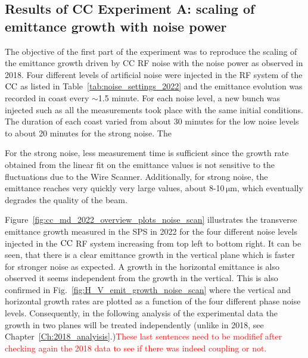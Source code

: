 \subsection{Results of CC Experiment A: scaling of emittance growth with noise power}

The objective of the first part of the experiment was to reproduce the scaling of the emittance growth driven by CC RF noise with the noise power as observed in 2018. Four different levels of artificial noise were injected in the RF system of the ${\mathrm{CC}}$ as listed in Table~\ref{tab:noise_settings_2022} and the emittance evolution was recorded in coast every $\sim$1.5 minute. For each noise level, a new bunch was injected such as all the measurements took place with the same initial conditions. The duration of each coast varied from about 30 minutes for the low noise levels to about 20 minutes for the strong noise. The 

For the strong noise, less measurement time is sufficient since the growth rate obtained from the linear fit on the emittance values is not sensitive to the fluctuations due to the Wire Scanner. Additionally, for strong noise, the emittance reaches very quickly very large values, about 8-10\,$\mathrm{\mu m}$, which eventually degrades the quality of the beam.

Figure~\ref{fig:cc_md_2022_overview_plots_noise_scan} illustrates the transverse emittance growth measured in the SPS in 2022 for the four different noise levels injected in the ${\mathrm{CC}}$ RF system increasing from top left to bottom right. It can be seen, that there is a clear emittance growth in the vertical plane which is faster for stronger noise as expected. A growth in the horizontal emittance is also observed it seems independent from the growth in the vertical. This is also confirmed in Fig.~\ref{fig:H_V_emit_growth_noise_scan} where the vertical and horizontal growth rates are plotted as a function of the four different phase noise levels. Consequently, in the following analysis of the experimental data the growth in two planes will be treated independently (unlike in 2018, see Chapter~\ref{Ch:2018_analyisis}.)\textcolor{red}{These last sentences need to be modifief after checking again the 2018 data to see if there was indeed coupling or not.}



